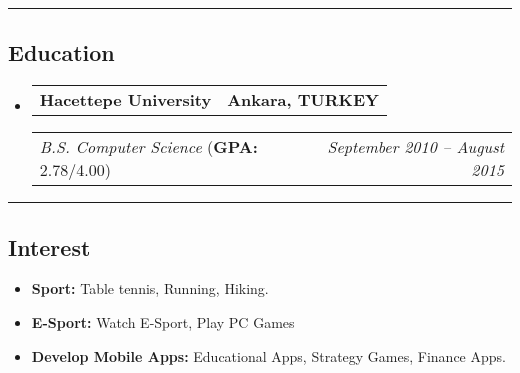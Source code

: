 \documentclass[11pt,letterpaper]{article}
\makeatletter
\newcommand{\headerrow}[2]
{\begin{tabular*}{\linewidth}{l@{\extracolsep{\fill}}r}
#1 &
#2 \\
\end{tabular*}}
\makeatother
\begin{document}
\hrule
\vspace{-1em}
\subsection*{\Large Education}

\begin{itemize}[leftmargin=1em]
	\parskip=0.1em
		
	\item
	      \headerrow
	      {\textbf{Hacettepe University}}
	      {\textbf{Ankara, TURKEY}}
	      \headerrow
	      {\emph{B.S. Computer Science} (\textbf{GPA:} 2.78/4.00)}
	      {\emph{September 2010 -- August 2015}}
	      	      
\end{itemize}

\hrule
\vspace{-1em}
\subsection*{\Large Interest}

\begin{itemize}[leftmargin=1em,noitemsep]
	\item \textbf{Sport:}
	      Table tennis, Running, Hiking.
	\item \textbf{E-Sport:}
	      Watch E-Sport, Play PC Games
	\item \textbf{Develop Mobile Apps:}
	      Educational Apps, Strategy Games, Finance Apps.
\end{itemize}
\end{document}
